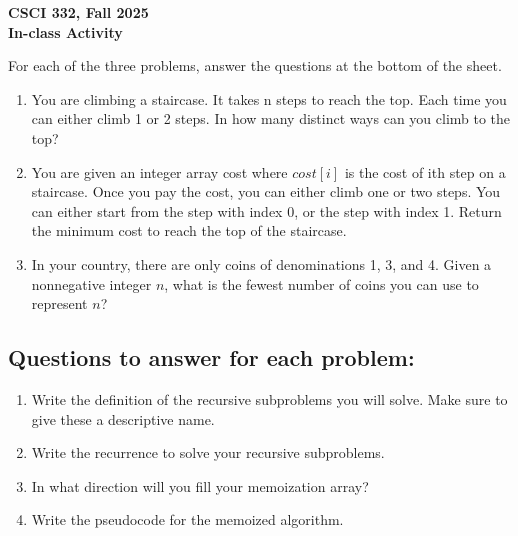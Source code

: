 \documentclass[11pt]{article}
\begin{document}
\begin{center}
\Large\textbf{CSCI 332, Fall 2025}%
\\
\LARGE\textbf{In-class Activity}%
\end{center}
For each of the three problems, answer the questions at the bottom of the sheet.
\begin{enumerate}
   \item 
You are climbing a staircase. It takes n steps to reach the top. Each time you
can either climb 1 or 2 steps. In how many distinct ways can you climb to the
top?
\item
You are given an integer array cost where $cost[i]$ is the cost of ith step on a
staircase. Once you pay the cost, you can either climb one or two steps. You
can either start from the step with index 0, or the step with index 1. Return the
minimum cost to reach the top of the staircase.
\item
In your country, there are only coins of denominations 1, 3, and 4. Given a
nonnegative integer $n$, what is the fewest number of coins you can use to
represent $n$?
\end{enumerate}

\subsection*{Questions to answer for each problem: }
\begin{enumerate}
   \item Write the definition of the recursive subproblems you will solve. Make sure to 
   give these a descriptive name.
   \item Write the recurrence to solve your recursive subproblems.
   \item In what direction will you fill your memoization array?
   \item Write the pseudocode for the memoized algorithm.
\end{enumerate}

\end{document}
